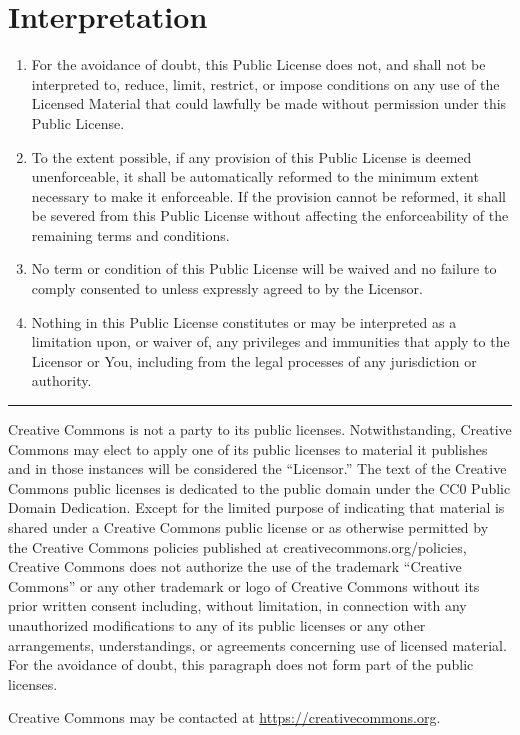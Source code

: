 \section{Interpretation}
\begin{enumerate}[label=\alph*.]
\item For the avoidance of doubt, this Public License does not, and
     shall not be interpreted to, reduce, limit, restrict, or impose
     conditions on any use of the Licensed Material that could lawfully
     be made without permission under this Public License.

\item To the extent possible, if any provision of this Public License is
     deemed unenforceable, it shall be automatically reformed to the
     minimum extent necessary to make it enforceable. If the provision
     cannot be reformed, it shall be severed from this Public License
     without affecting the enforceability of the remaining terms and
     conditions.

\item No term or condition of this Public License will be waived and no
     failure to comply consented to unless expressly agreed to by the
     Licensor.

\item Nothing in this Public License constitutes or may be interpreted
     as a limitation upon, or waiver of, any privileges and immunities
     that apply to the Licensor or You, including from the legal
     processes of any jurisdiction or authority.
\end{enumerate}

\hrule

\bigskip

Creative Commons is not a party to its public
licenses. Notwithstanding, Creative Commons may elect to apply one of
its public licenses to material it publishes and in those instances
will be considered the “Licensor.” The text of the Creative Commons
public licenses is dedicated to the public domain under the CC0 Public
Domain Dedication. Except for the limited purpose of indicating that
material is shared under a Creative Commons public license or as
otherwise permitted by the Creative Commons policies published at
creativecommons.org/policies, Creative Commons does not authorize the
use of the trademark ``Creative Commons'' or any other trademark or
logo of Creative Commons without its prior written consent including,
without limitation, in connection with any unauthorized modifications
to any of its public licenses or any other arrangements,
understandings, or agreements concerning use of licensed material. For
the avoidance of doubt, this paragraph does not form part of the
public licenses.

Creative Commons may be contacted at \url{https://creativecommons.org}.

\renewcommand*\thesection{\arabic{chapter}.\arabic{section}}

